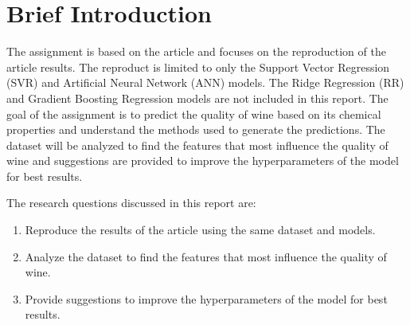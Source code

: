 \documentclass{article}
\begin{document}

\section{Brief Introduction}
The assignment is based on the article \cite{dahal2021prediction} and focuses on the reproduction of the article results.
The reproduct is limited to only the Support Vector Regression (SVR) and Artificial Neural Network (ANN) models.
The Ridge Regression (RR) and Gradient Boosting Regression models are not included in this report.
The goal of the assignment is to predict the quality of wine based on its chemical properties and understand the methods used to generate the predictions.
The dataset will be analyzed to find the features that most influence the quality of wine and suggestions are provided to improve the hyperparameters of the model for best results.

The research questions discussed in this report are:
\begin{enumerate}
    \item Reproduce the results of the article \cite{dahal2021prediction} using the same dataset and models.
    \item Analyze the dataset to find the features that most influence the quality of wine.
    \item Provide suggestions to improve the hyperparameters of the model for best results.
\end{enumerate}
\end{document}
